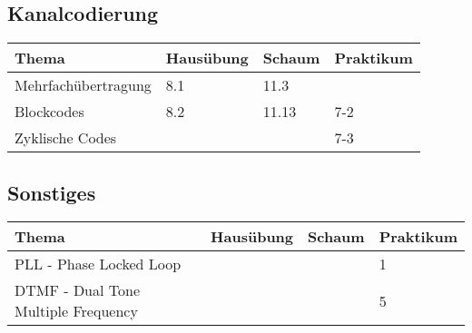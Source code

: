 \subsection{Kanalcodierung}
	\begin{tabular}{|p{9cm}|p{2.5cm}|p{3.5cm}|p{2cm}|}
	\hline
	\textbf{Thema} & \textbf{Hausübung} & \textbf{Schaum} & \textbf{Praktikum} \\ 
	\hline
	\hline
	Mehrfachübertragung & 8.1 & 11.3 & \\
	\hline
	Blockcodes & 8.2 & 11.13 & 7-2\\
	\hline
	Zyklische Codes & & & 7-3\\
	\hline
	\end{tabular}
\subsection{Sonstiges}
	\begin{tabular}{|p{9cm}|p{2.5cm}|p{3.5cm}|p{2cm}|}
	\hline  
	\textbf{Thema} & \textbf{Hausübung} & \textbf{Schaum} & \textbf{Praktikum} \\ 
	\hline
	\hline
	PLL - Phase Locked Loop	& & & 1 \\
	\hline
	DTMF - Dual Tone Multiple Frequency & & & 5\\
	\hline
	\end{tabular}
